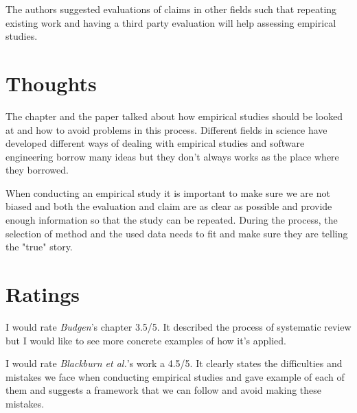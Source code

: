 \documentclass[sigconf]{acmart}
\begin{document}
The authors suggested evaluations of claims in other fields such that repeating existing work and having a third party evaluation will help assessing empirical studies.

\section{Thoughts}
The chapter and the paper talked about how empirical studies should be looked at and how to avoid problems in this process. Different fields in science have developed different ways of dealing with empirical studies and software engineering borrow many ideas but they don't always works as the place where they borrowed.

When conducting an empirical study it is important to make sure we are not biased and both the evaluation and claim are as clear as possible and provide enough information so that the study can be repeated. During the process, the selection of method and the used data needs to fit and make sure they are telling the "true" story.


\section{Ratings}
I would rate {\it Budgen}'s chapter 3.5/5. It described the process of systematic review but I would like to see more concrete examples of how it's applied.

I would rate {\it Blackburn et al.}'s work a 4.5/5. It clearly states the difficulties and mistakes we face when conducting empirical studies and gave example of each of them and suggests a framework that we can follow and avoid making these mistakes.
\end{document}
